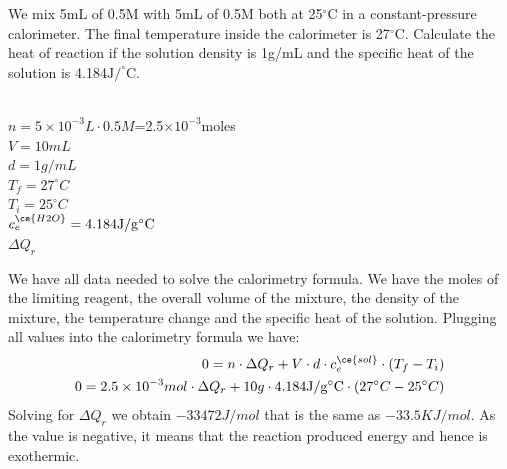 \documentclass[main.tex]{subfiles}
\begin{document}
\begin{description}
\begin{example} %
We mix 5mL of  0.5M with 5mL of  0.5M both at 25$^{\circ}$C in a constant-pressure calorimeter. The final temperature inside the calorimeter is 27$^{\circ}$C. Calculate the heat of reaction if the solution density is 1g/mL and the specific heat of the solution is 4.184$\text{J}/^{\circ}\text{C}$.
\\
\\
\begin{tcbitemize}[raster columns=3, raster rows=3, enhanced, sharp corners, raster equal height=rows, raster force size=false, raster column skip=0pt, raster row skip = 0pt]
\tcbitem[blankest, width=1cm]
\tcbitem[header = helpful]
\texta
\tcbitem[header = harmful]
\textb
\tcbitem[firstcol = internal]
\textcn
\tcbitem[swotbox = G]
$n=5\times 10^{-3}L\cdot 0.5M$=2.5$\times 10^{-3}$moles\\
$V=10mL$\\
$d=1g/mL$\\
$T_{f}=27^{\circ}C$\\
$T_{i}=25^{\circ}C$\\
$c_{e}^{\ce{H2O}}=\\4.184 \text{J}/\text{g}^{\circ}\text{C}$\\
\tcbitem[swotbox = A]
$\Delta Q_{r}$\\
\end{tcbitemize}%
We have all data needed to solve the calorimetry formula. We have the moles of the limiting reagent, the overall volume of the mixture, the density of the mixture, the temperature change and the specific heat of the solution. Plugging all values into the calorimetry formula we have:\\
\begin{equation*}\begin{split}
 0=n\cdot\Delta Q_{r}+V\cdot d\cdot  c_{e}^{\ce{sol}}\cdot  (T_{f}-T_{i})      \\
0=2.5\times 10^{-3}mol\cdot\Delta Q_{r}+10g\cdot 4.184 \text{J}/\text{g}^{\circ}\text{C}\cdot  (27^{\circ}C-25^{\circ}C)  \\
 \end{split}\end{equation*}
Solving for $\Delta Q_{r}$ we obtain $-33472J/mol$ that is the same as $-33.5KJ/mol$. As the value is negative, it means that the reaction produced energy and hence is exothermic.

\end{example}
\end{description}
\end{document}

